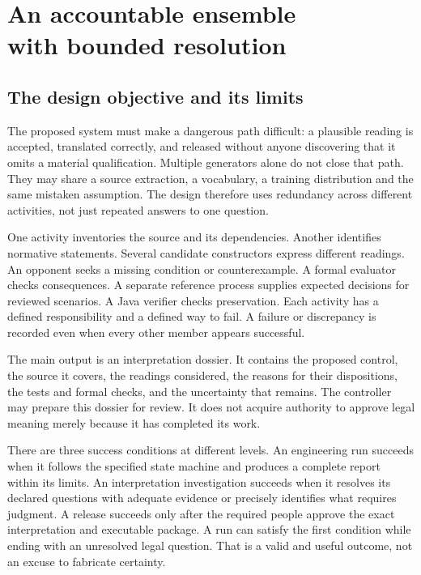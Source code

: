 \chapter[An accountable ensemble with bounded resolution]{An accountable ensemble\\with bounded resolution}
\label{ch:ensemble}

\section{The design objective and its limits}

The proposed system must make a dangerous path difficult: a plausible reading is
accepted, translated correctly, and released without anyone discovering that it
omits a material qualification. Multiple generators alone do not close that path.
They may share a source extraction, a vocabulary, a training distribution and the
same mistaken assumption. The design therefore uses redundancy across different
activities, not just repeated answers to one question.

One activity inventories the source and its dependencies. Another identifies
normative statements. Several candidate constructors express different readings.
An opponent seeks a missing condition or counterexample. A formal evaluator
checks consequences. A separate reference process supplies expected decisions
for reviewed scenarios. A Java verifier checks preservation. Each activity has a
defined responsibility and a defined way to fail. A failure or discrepancy is
recorded even when every other member appears successful.

The main output is an interpretation dossier. It contains the proposed control,
the source it covers, the readings considered, the reasons for their dispositions,
the tests and formal checks, and the uncertainty that remains. The controller
may prepare this dossier for review. It does not acquire authority to approve
legal meaning merely because it has completed its work.

There are three success conditions at different levels. An engineering run
succeeds when it follows the specified state machine and produces a complete
report within its limits. An interpretation investigation succeeds when it
resolves its declared questions with adequate evidence or precisely identifies
what requires judgment. A release succeeds only after the required people approve
the exact interpretation and executable package. A run can satisfy the first
condition while ending with an unresolved legal question. That is a valid and
useful outcome, not an excuse to fabricate certainty.

